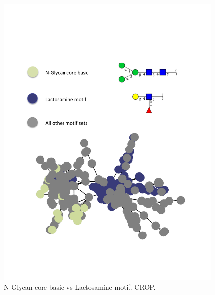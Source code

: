 \documentclass[12pt,a4paper]{article}
\begin{document}
\begin{figure}[H]
\centering 
\includegraphics[scale=0.7]{motif_similarity_exploration/N-Glycan_core_basic_vs_Lactosamine_motif.pdf} 
\caption{N-Glycan core basic vs Lactosamine motif. CROP.}
\label{fig:N-Glycan_core_basic_vs_Lactosamine_motif}
\end{figure}
\end{document}
